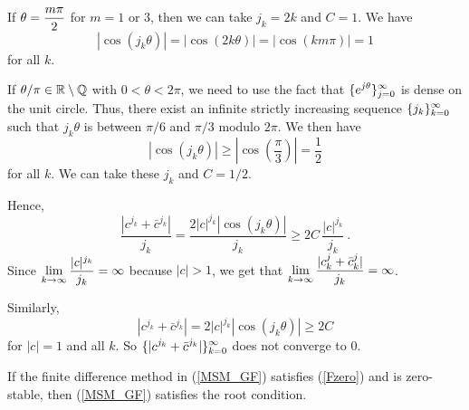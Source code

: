 \begin{rmkList}
\begin{enumerate}
If $\displaystyle \theta = \frac{m \pi}{2}$ for $m=1$ or $3$, then
we can take $j_k = 2k$ and $C = 1$.  We have
\[
  |\cos(j_k \theta)| = |\cos( 2k\theta)| = |\cos(k m \pi)| = 1
\]
for all $k$.

If $\theta/\pi \in \mathbb{R} \setminus \mathbb{Q}$ with $0 < \theta < 2\pi$, we
need to use the fact that $\displaystyle \{ e^{j\theta} \}_{j=0}^\infty$
is dense on the unit circle.  Thus, there exist an infinite strictly
increasing sequence $\displaystyle \{j_k\}_{k=0}^\infty$ such that
$j_k \theta$ is between $\pi/6$ and $\pi/3$ modulo $2\pi$.  We then have
\[
  |\cos(j_k \theta)|
  \geq \left|\cos\left(\frac{\pi}{3}\right)\right| = \frac{1}{2}
\]
for all $k$.  We can take these $j_k$ and $C = 1/2$.

Hence,
\[
\frac{|c^{j_k}+\bar{c}^{j_k}|}{j_k}
= \frac{2|c|^{j_k} |\cos(j_k \theta)|}{j_k}
\geq 2C\, \frac{|c|^{j_k}}{j_k} \ .
\]
Since $\displaystyle \lim_{k\to \infty} \frac{|c|^{j_k}}{j_k} = \infty$
because $|c|>1$, we get that
$\displaystyle \lim_{k\to \infty} \frac{|c^j_k+\bar{c}^j_k|}{j_k} = \infty$.

Similarly,
\[
  |c^{j_k}+\bar{c}^{j_k}| = 2|c|^{j_k} |\cos(j_k \theta)|
  \geq 2C
\]
for $|c|=1$ and all $k$.  So
$\displaystyle \{|c^{j_k}+\bar{c}^{j_k}|\}_{k=0}^\infty$ does not
converge to $0$.
\end{enumerate}
\label{cjdiverges}
\end{rmkList}

\begin{prop}
If the finite difference method in (\ref{MSM_GF}) satisfies (\ref{Fzero})
and is zero-stable, then (\ref{MSM_GF}) satisfies the root
condition. \label{ZeroStabRootCond}
\end{prop}

